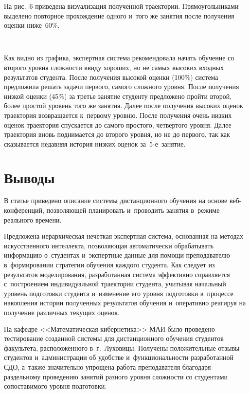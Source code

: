 \begin{multicols}{2}
  
  На рис.~6 приведена визуализация полученной траектории. 
Прямоугольниками выделено повторное прохождение одного и~того же занятия 
после получения оценки ниже~60\%.
  
  \begin{figure*} %
   \vspace*{1pt}
\begin{center}
\mbox{%
\epsfxsize=160.48mm
}
\end{center}
\vspace*{-9pt}
  \end{figure*}
  
  Как видно из графика, экспертная система рекомендовала начать обучение со 
второго уровня сложности ввиду хороших, но не самых высоких входных 
результатов студента. После получения высокой оценки (100\%) система 
предложила решать задачи первого, самого сложного уровня. После получения 
низкой оценки (45\%) за третье занятие студенту предложено пройти второй, 
более простой уровень того же занятия. Далее после получения высоких оценок 
траектория возвращается к~первому уровню. После получения очень низких 
оценок траектория спускается до самого простого, четвертого уровня. Далее 
траектория вновь поднимается до второго уровня, но не до первого, так как 
сказывается недавняя история низких оценок за~5-е~занятие.
  
\section{Выводы}
  
  В статье приведено описание системы дистанционного обучения на основе 
веб-кон\-фе\-рен\-ций, позволяющей планировать и~проводить занятия в~режиме 
реального времени. 

Предложена иерархическая нечеткая экспертная система, 
основанная на методах искусственного интеллекта, поз\-во\-ля\-ющая 
автоматически обрабатывать информацию о~студентах и~экспертные данные 
для помощи преподавателю в~формировании стратегии обучения каждого 
студента. Как следует из результатов моделирования, разработанная система 
эффективно справляется с~построением индивидуальной траектории студента, 
учитывая начальный уровень подготовки студента и~изменение его уровня 
подготовки в~процессе накопления истории полученных результатов 
обучения и~оперативно реагируя на получение различных текущих оценок. 

На кафедре 
<<Математическая кибернетика>> МАИ было проведено тестирование 
созданной сис\-те\-мы для дистанционного обучения студентов факультета, 
расположенного в~г.~Луховицы. Получены положительные отзывы студентов 
и~администрации об удобстве и~функциональности разработанной СДО, 
а~также значительно упрощена работа преподавателя благодаря раздельному 
проведению занятий разного уровня сложности со студентами сопоставимого 
уровня подготовки.
  

\end{multicols}

